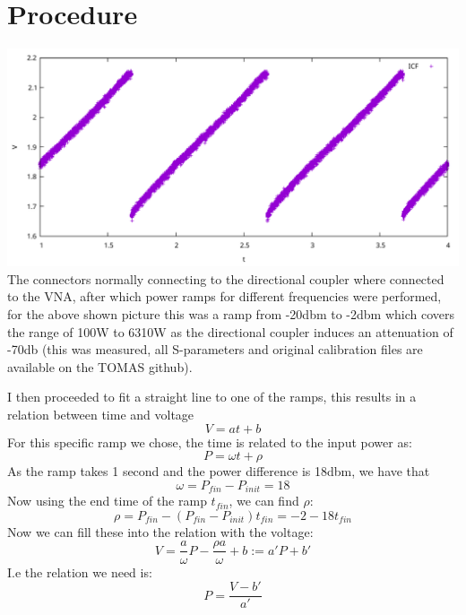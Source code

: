 \documentclass{report}
\begin{document}
\section{Procedure}
\includegraphics[width=\textwidth]{figures/example_ramp.pdf}
The connectors normally connecting to the directional coupler where connected
to the VNA, after which power ramps for different frequencies were performed,
for the above shown picture this was a ramp from -20dbm to -2dbm which covers
the range of 100W to 6310W as the directional coupler induces an attenuation of
-70db (this was measured, all S-parameters and original calibration files
are available on the TOMAS github).

I then proceeded to fit a straight line to one of the ramps, this results in
a relation between time and voltage
\begin{equation}
    V = a t + b
\end{equation}
For this specific ramp we chose, the time is related to the input power as:
\begin{equation}
    P = \omega t + \rho
\end{equation}
As the ramp takes 1 second and the power difference is 18dbm, we have that 
\begin{equation}
    \omega = P_{fin} - P_{init} = 18
\end{equation}
Now using the end time of the ramp $t_{fin}$, we can find $\rho$:
\begin{equation}
    \rho = P_{fin} - (P_{fin} - P_{init}) t_{fin} = -2-18t_{fin}
\end{equation}
Now we can fill these into the relation with the voltage:
\begin{equation}
    V = \frac{a}{\omega}P - \frac{\rho a}{\omega} + b := a'P + b'
\end{equation}
I.e the relation we need is:
\begin{equation}
    P = \frac{V - b'}{a'}
\end{equation}
\end{document}
